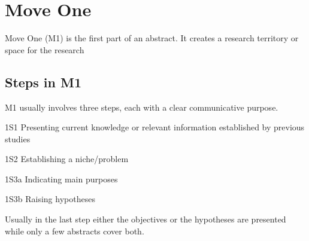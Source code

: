 \documentclass[a4paper]{ctexbook}
\begin{document}
\chapter{Move One}\label{chapter3}

Move One (M1) is the first part of an abstract. It creates a research territory or space for the research

\section{Steps in M1}

M1 usually involves three steps, each with a clear communicative purpose.

1S1 Presenting current knowledge or relevant information established by previous studies

1S2 Establishing a niche/problem

1S3a Indicating main purposes

1S3b Raising hypotheses

Usually in the last step either the objectives or the hypotheses are presented while only a few abstracts cover both.
\end{document}
